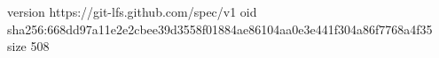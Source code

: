 version https://git-lfs.github.com/spec/v1
oid sha256:668dd97a11e2e2cbee39d3558f01884ae86104aa0e3e441f304a86f7768a4f35
size 508
